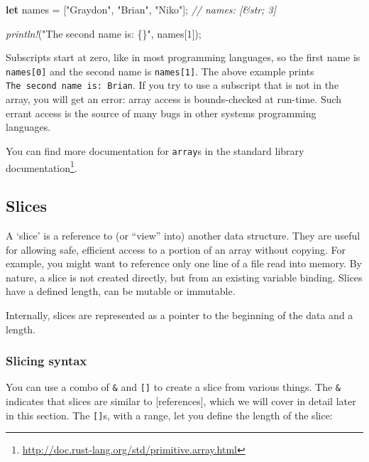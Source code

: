 \documentclass[a4paper,]{book}
\newenvironment{Shaded}{\begin{snugshade}}{\end{snugshade}}
\newcommand{\KeywordTok}[1]{\textcolor[rgb]{0.13,0.29,0.53}{\textbf{{#1}}}}
\newcommand{\DecValTok}[1]{\textcolor[rgb]{0.00,0.00,0.81}{{#1}}}
\newcommand{\StringTok}[1]{\textcolor[rgb]{0.31,0.60,0.02}{{#1}}}
\newcommand{\CommentTok}[1]{\textcolor[rgb]{0.56,0.35,0.01}{\textit{{#1}}}}
\newcommand{\PreprocessorTok}[1]{\textcolor[rgb]{0.56,0.35,0.01}{\textit{{#1}}}}
\newcommand{\NormalTok}[1]{{#1}}
\renewcommand{\href}[2]{#2\footnote{\url{#1}}}
\begin{document}
\begin{Shaded}
\begin{Highlighting}[]
\KeywordTok{let} \NormalTok{names = [}\StringTok{"Graydon"}\NormalTok{, }\StringTok{"Brian"}\NormalTok{, }\StringTok{"Niko"}\NormalTok{]; }\CommentTok{// names: [&str; 3]}

\PreprocessorTok{println!}\NormalTok{(}\StringTok{"The second name is: \{\}"}\NormalTok{, names[}\DecValTok{1}\NormalTok{]);}
\end{Highlighting}
\end{Shaded}

Subscripts start at zero, like in most programming languages, so the
first name is \texttt{names{[}0{]}} and the second name is
\texttt{names{[}1{]}}. The above example prints
\texttt{The\ second\ name\ is:\ Brian}. If you try to use a subscript
that is not in the array, you will get an error: array access is
bounds-checked at run-time. Such errant access is the source of many
bugs in other systems programming languages.

You can find more documentation for \texttt{array}s
\href{http://doc.rust-lang.org/std/primitive.array.html}{in the standard
library documentation}.

\subsection{Slices}\label{slices}

A `slice' is a reference to (or ``view'' into) another data structure.
They are useful for allowing safe, efficient access to a portion of an
array without copying. For example, you might want to reference only one
line of a file read into memory. By nature, a slice is not created
directly, but from an existing variable binding. Slices have a defined
length, can be mutable or immutable.

Internally, slices are represented as a pointer to the beginning of the
data and a length.

\subsubsection{Slicing syntax}\label{slicing-syntax}

You can use a combo of \texttt{\&} and \texttt{{[}{]}} to create a slice
from various things. The \texttt{\&} indicates that slices are similar
to {[}references{]}, which we will cover in detail later in this
section. The \texttt{{[}{]}}s, with a range, let you define the length
of the slice:
\end{document}
